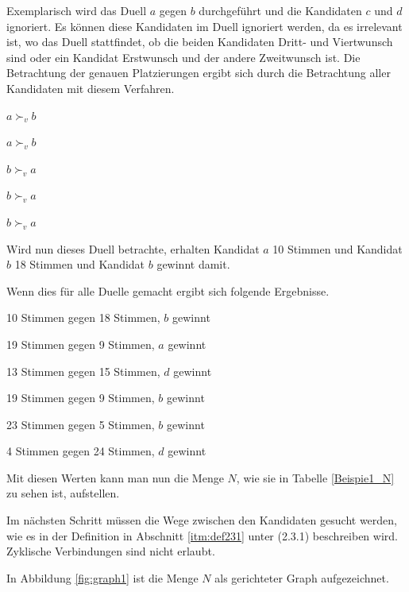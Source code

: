 Exemplarisch wird das Duell $a$ gegen $b$ durchgeführt und die Kandidaten $c$ und $d$ ignoriert. Es können diese Kandidaten im Duell ignoriert werden, da es irrelevant ist, wo das Duell stattfindet, ob die beiden Kandidaten Dritt- und Viertwunsch sind oder ein Kandidat Erstwunsch und der andere Zweitwunsch ist. Die Betrachtung der genauen Platzierungen ergibt sich durch die Betrachtung aller Kandidaten mit diesem Verfahren.

\begin{description}
\centering
\item[6 mal] $a \succ_{v} b$
\item[4 mal] $a \succ_{v} b$
\item[10 mal] $b \succ_{v} a$
\item[3 mal] $b \succ_{v} a$
\item[5 mal] $b \succ_{v}a$
\end{description}

Wird nun dieses Duell betrachte, erhalten Kandidat $a$ 10 Stimmen und Kandidat $b$ 18 Stimmen und Kandidat $b$ gewinnt damit.


Wenn dies für alle Duelle gemacht ergibt sich folgende Ergebnisse.
 \begin{description}
 \centering
 \item[$a$ vs. $b$] 10 Stimmen gegen 18 Stimmen, $b$ gewinnt
 \item[$a$ vs. $c$] 19 Stimmen gegen 9 Stimmen, $a$ gewinnt
 \item[$a$ vs. $d$] 13 Stimmen gegen 15 Stimmen, $d$ gewinnt
 \item[$b$ vs. $c$] 19 Stimmen gegen 9 Stimmen, $b$ gewinnt
 \item[$b$ vs. $d$] 23 Stimmen gegen 5 Stimmen, $b$ gewinnt
 \item[$c$ vs. $d$] 4 Stimmen gegen 24 Stimmen, $d$ gewinnt
 \end{description}
 
 Mit diesen Werten kann man nun die Menge $N$, wie sie in Tabelle \ref{Beispie1_N} zu sehen ist, aufstellen.



Im nächsten Schritt müssen die Wege zwischen den Kandidaten gesucht werden, wie es in der Definition in Abschnitt \ref{itm:def231} unter (2.3.1) beschreiben wird. Zyklische Verbindungen sind nicht erlaubt.

In Abbildung \ref{fig:graph1} ist die Menge $N$ als gerichteter Graph aufgezeichnet.


